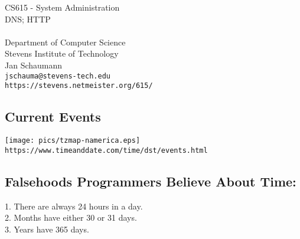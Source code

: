 \documentclass[xga]{xdvislides}
\begin{document}
\setfontphv

\lhead{\slidetitle}                               %
\cfoot{\relax}                               %
\rfoot{\Gray{\today}}

\newcommand{\smallish}{\fontsize{15}{20}\selectfont}

\vspace*{\fill}
\begin{center}
	\Hugesize
		CS615 - System Administration\\ [1em]
		DNS; HTTP\\ [1em]
	\hspace*{5mm}\blueline\\ [1em]
	\Normalsize
		Department of Computer Science\\
		Stevens Institute of Technology\\
		Jan Schaumann\\
		\verb+jschauma@stevens-tech.edu+ \\
		\verb+https://stevens.netmeister.org/615/+
\end{center}
\vspace*{\fill}

\subsection{Current Events}
\vspace*{\fill}
\begin{center}
	\texttt{[image: pics/tzmap-namerica.eps]} \\
	\verb+https://www.timeanddate.com/time/dst/events.html+
\end{center}
\vspace*{\fill}

\subsection{Falsehoods Programmers Believe About Time:}
\Huge
1. There are always 24 hours in a day. \\

2. Months have either 30 or 31 days. \\

3. Years have 365 days. \\
\end{document}
